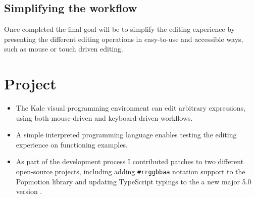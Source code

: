 \subsection{Simplifying the workflow}
Once completed the final goal will be to simplify the editing experience by
presenting the different editing operations in easy-to-use and accessible ways,
such as mouse or touch driven editing.

\section{Project}

\begin{itemize}
	\item The Kale visual programming environment can edit arbitrary expressions,
	using both mouse-driven and keyboard-driven workflows.
	
	\item A simple interpreted programming language enables testing the editing
	experience on functioning examples.
	
	\item As part of the development process I contributed patches to two different
	open-source projects, including adding \texttt{\#rrggbbaa} notation support
	to the Popmotion library \citep{github-pr-popmotion} and updating
	 TypeScript typings to the a new major 5.0
	version \citep{github-pr-styled-components}.
\end{itemize}
